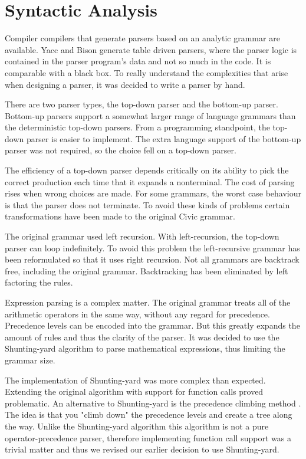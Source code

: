 \documentclass[12pt]{article}
\begin{document}
\section{Syntactic Analysis}

Compiler compilers that generate parsers based on an analytic grammar are available. Yacc and Bison generate table driven parsers, where the parser logic is contained in the parser program's data and not so much in the code. It is comparable with a black box. To really understand the complexities that arise when designing a parser, it was decided to write a parser by hand.

There are two parser types, the top-down parser and the bottom-up parser. Bottom-up parsers support a somewhat larger range of language grammars than the deterministic top-down parsers. From a programming standpoint, the top-down parser is easier to implement. The extra language support of the bottom-up parser was not required, so the choice fell on a top-down parser.  

The efficiency of a top-down parser depends critically on its ability to pick the correct production each time that it expands a nonterminal. The cost of parsing rises when wrong choices are made. For some grammars, the worst case behaviour is that the parser does not terminate. To avoid these kinds of problems certain transformations have been made to the original Civic grammar.

The original grammar used left recursion. With left-recursion, the top-down parser can loop indefinitely. To avoid this problem the left-recursive grammar has been reformulated so that it uses right recursion. Not all grammars are backtrack free, including the original grammar. Backtracking has been eliminated by left factoring the rules.

Expression parsing is a complex matter. The original grammar treats all of the arithmetic operators in the same way, without any regard for precedence. Precedence levels can be encoded into the grammar. But this greatly expands the amount of rules and thus the clarity of the parser. It was decided to use the Shunting-yard algorithm \cite{dijkstrashunting} to parse mathematical expressions, thus limiting the grammar size. 

The implementation of Shunting-yard was more complex than expected. Extending the original algorithm with support for function calls proved problematic. An alternative to Shunting-yard is the precedence climbing method \cite{richards1981bcpl}. The idea is that you "climb down" the precedence levels and create a tree along the way. Unlike the Shunting-yard algorithm this algorithm is not a pure operator-precedence parser, therefore implementing function call support was a trivial matter and thus we revised our earlier decision to use Shunting-yard.
\end{document}

